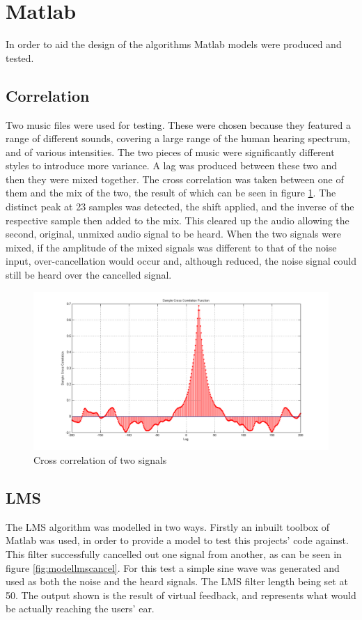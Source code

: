 \section{Matlab}
In order to aid the design of the algorithms Matlab models were produced and
tested.

\subsection{Correlation}

Two music files were used for testing.
These were chosen because they featured a range of different sounds, covering a large range of the human hearing spectrum, and of various intensities.
The two pieces of music were significantly different styles to introduce more variance.
A lag was produced between these two and then they were mixed together.
The cross correlation was taken between one of them and the mix of the two, the result of which can be seen in figure \ref{fig:modelcrosscorr}.
The distinct peak at 23 samples was detected, the shift applied, and the inverse of the respective sample then added to the mix.
This cleared up the audio allowing the second, original, unmixed audio signal to be heard.
When the two signals were mixed, if the amplitude of the mixed signals was different to that of the noise input, over-cancellation would occur and, although reduced, the noise signal could still be heard over the cancelled signal.

\begin{figure}[H]
	\centering
	\includegraphics[width=\textwidth]{./img/crosscorr.png}
	\caption{Cross correlation of two signals}
	\label{fig:modelcrosscorr}
\end{figure}

\subsection{LMS}
The LMS algorithm was modelled in two ways.
Firstly an inbuilt toolbox of Matlab was used, in order to provide a model to test this projects' code against.
This filter successfully cancelled out one signal from another, as can be seen in figure \ref{fig:modellmscancel}.
For this test a simple sine wave was generated and used as both the noise and the heard signals.
The LMS filter length being set at 50.
The output shown is the result of virtual feedback, and represents what would be actually reaching the users' ear.

